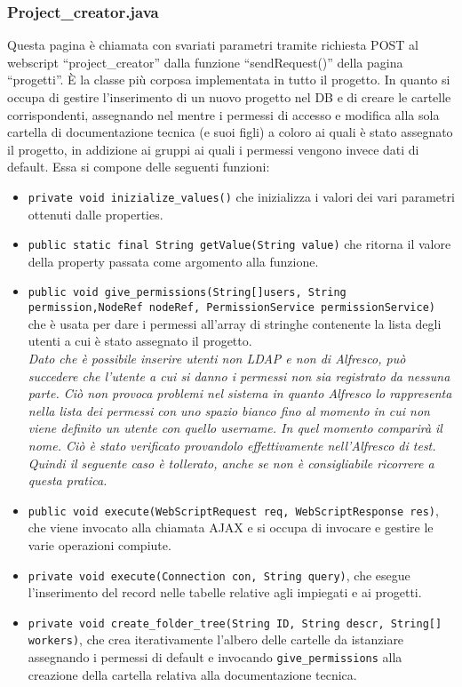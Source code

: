 \subsubsection{Project\_creator.java}
Questa pagina è chiamata con svariati parametri tramite richiesta POST al webscript “project\_creator” dalla funzione “sendRequest()” della pagina “progetti”. È la classe più corposa implementata in tutto il progetto. In quanto si occupa di gestire l’inserimento di un nuovo progetto nel DB e di creare le cartelle corrispondenti, assegnando nel mentre i permessi di accesso e modifica alla sola cartella di documentazione tecnica (e suoi figli) a coloro ai quali è stato assegnato il progetto, in addizione ai gruppi ai quali i permessi vengono invece dati di default.
Essa si compone delle seguenti funzioni:
\begin{itemize}
\item \texttt{private void inizialize\_values()} che inizializza i valori dei vari parametri ottenuti dalle properties.
\item \texttt{public static final String getValue(String value)} che ritorna il valore della property passata come argomento alla funzione.
\item \texttt{public void give\_permissions(String[]users, String permission,NodeRef nodeRef, PermissionService permissionService)} che è usata per dare i permessi all’array di stringhe contenente la lista degli utenti a cui è stato assegnato il progetto.\\
\emph{Dato che è possibile inserire utenti non LDAP e non di Alfresco, può succedere che l’utente a cui si danno i permessi non sia registrato da nessuna parte. Ciò non provoca problemi nel sistema in quanto Alfresco lo rappresenta nella lista dei permessi con uno spazio bianco fino al momento in cui non viene definito un utente con quello username. In quel momento comparirà il nome. Ciò è stato verificato provandolo effettivamente nell’Alfresco di test. Quindi il seguente caso è tollerato, anche se non è consigliabile ricorrere a questa pratica.}
\item \texttt{public void execute(WebScriptRequest req, WebScriptResponse res)}, che viene invocato alla chiamata AJAX e si occupa di invocare e gestire le varie operazioni compiute.
\item \texttt{private void execute(Connection con, String query)}, che esegue l’inserimento del record nelle tabelle relative agli impiegati e ai progetti.
\item \texttt{private void create\_folder\_tree(String ID, String descr, String[] workers)}, che crea iterativamente l’albero delle cartelle da istanziare assegnando i permessi di default e invocando \texttt{give\_permissions} alla creazione della cartella relativa alla documentazione tecnica.
\end{itemize}
